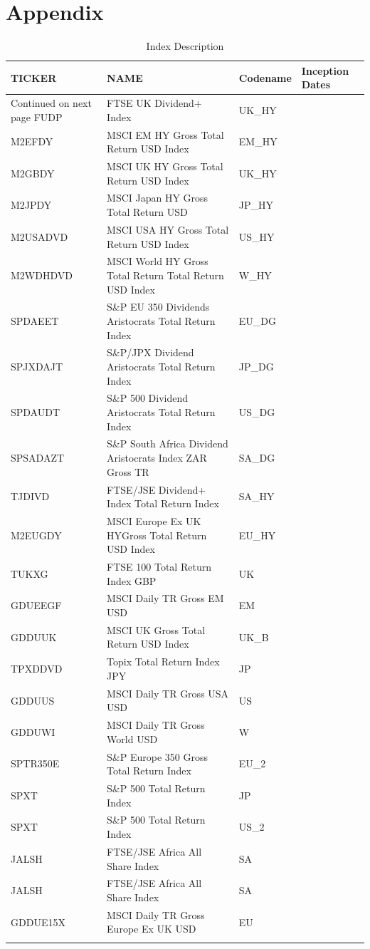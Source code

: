 \documentclass[11pt,preprint, authoryear]{elsarticle}
\numberwithin{equation}{section}
\numberwithin{figure}{section}
\numberwithin{table}{section}
\begin{document}
\newpage

\hypertarget{appendix}{%
\section*{Appendix}\label{appendix}}

\begingroup\fontsize{8pt}{9pt}\selectfont
\begin{longtable}{llll}
  \toprule
TICKER & NAME & Codename & Inception Dates \\ 
  \hline 
\endhead 
\hline 
{\footnotesize Continued on next page} 
\endfoot 
\endlastfoot 
 \midrule
FUDP & FTSE UK Dividend+ Index & UK\_HY &  \\ 
  M2EFDY & MSCI EM HY Gross Total Return USD Index & EM\_HY &  \\ 
  M2GBDY & MSCI UK HY Gross Total Return USD Index & UK\_HY &  \\ 
  M2JPDY & MSCI Japan HY Gross Total Return USD & JP\_HY &  \\ 
  M2USADVD & MSCI USA HY Gross Total Return USD Index & US\_HY &  \\ 
  M2WDHDVD & MSCI World HY Gross Total Return Total Return USD Index & W\_HY &  \\ 
  SPDAEET & S\&P EU 350 Dividends Aristocrats Total Return Index & EU\_DG &  \\ 
  SPJXDAJT & S\&P/JPX Dividend Aristocrats Total Return Index & JP\_DG &  \\ 
  SPDAUDT & S\&P 500 Dividend Aristocrats Total Return Index & US\_DG &  \\ 
  SPSADAZT & S\&P South Africa Dividend Aristocrats Index ZAR Gross TR & SA\_DG &  \\ 
  TJDIVD & FTSE/JSE Dividend+ Index Total Return Index & SA\_HY &  \\ 
  M2EUGDY & MSCI Europe Ex UK HYGross Total Return USD Index & EU\_HY &  \\ 
  TUKXG & FTSE 100 Total Return Index GBP & UK &  \\ 
  GDUEEGF & MSCI Daily TR Gross EM USD & EM &  \\ 
  GDDUUK & MSCI UK Gross Total Return USD Index & UK\_B &  \\ 
  TPXDDVD & Topix Total Return Index JPY & JP &  \\ 
  GDDUUS & MSCI Daily TR Gross USA USD & US &  \\ 
  GDDUWI & MSCI Daily TR Gross World USD & W &  \\ 
  SPTR350E & S\&P Europe 350 Gross Total Return Index & EU\_2 &  \\ 
  SPXT & S\&P 500 Total Return Index & JP &  \\ 
  SPXT & S\&P 500 Total Return Index & US\_2 &  \\ 
  JALSH & FTSE/JSE Africa All Share Index & SA &  \\ 
  JALSH & FTSE/JSE Africa All Share Index & SA &  \\ 
  GDDUE15X & MSCI Daily TR Gross Europe Ex UK USD & EU &  \\ 
   \bottomrule
\caption{Index Description \label{tabdes}} 
\end{longtable}
\endgroup
\end{document}

